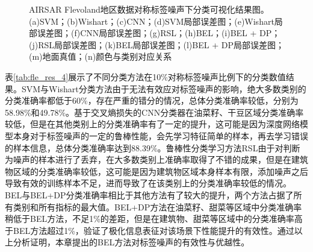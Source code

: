 \begin{figure}[ht!]

    \caption{AIRSAR Flevoland地区数据对称标签噪声下分类可视化结果图。(a)SVM；(b)Wishart；(c)CNN；(d)SVM局部误差图；(e)Wishart局部误差图；(f)CNN局部误差图；(g)RSL；(h)BEL；(i)BEL + DP；(j)RSL局部误差图；(k)BEL局部误差图；(l)BEL + DP局部误差图；(m)地面真值；(n)颜色与类别对应关系}
    \label{fig:fle_res_4}
\end{figure}

表\ref{tab:fle_res_4}展示了不同分类方法在10\%对称标签噪声比例下的分类数值结果。SVM与Wishart分类方法由于无法有效应对标签噪声的影响，绝大多数类别的分类准确率都低于60\%，存在严重的错分的情况，总体分类准确率较低，分别为58.98\%和49.78\%。基于交叉熵损失的CNN分类器在油菜籽、干豆区域分类准确率较低，但是在其他类别上的分类准确率有了一定的提升，这可能是因为深度网络模型本身对于标签噪声的一定的鲁棒性能，会先学习特征简单的样本，再去学习错误的样本信息，总体分类准确率达到88.39\%。鲁棒性分类学习方法RSL由于对判断为噪声的样本进行了丢弃，在大多数类别上准确率取得了不错的成果，但是在建筑物区域的分类准确率较低，这可能是因为建筑物区域本身样本有限，添加噪声之后导致有效的训练样本不足，进而导致了在该类别上的分类准确率较低的情况。BEL与BEL+DP分类准确率相比于其他方法有了较大的提升，两个方法占据了所有类别和所有指标的最大值。BEL+DP方法在油菜籽、甜菜等区域中分类准确率稍低于BEL方法，不足1\%的差距，但是在建筑物、甜菜等区域中的分类准确率高于BEL方法超过1\%，验证了极化信息表征对该场景下性能提升的有效性。通过以上分析证明，本章提出的BEL方法对标签噪声的有效性与优越性。

